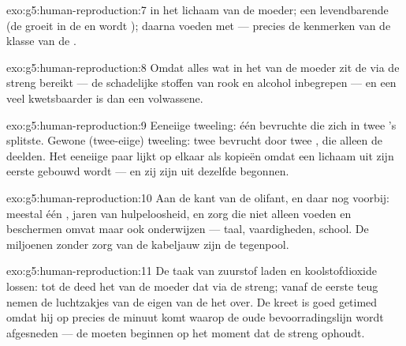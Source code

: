 \begin{solution}{exo:g5:human-reproduction:7}
 in het lichaam van de moeder; een levendbarende  (de
 groeit in de  en wordt ); daarna voeden met
 --- precies de kenmerken van de klasse van de .
\end{solution}

\begin{solution}{exo:g5:human-reproduction:8}
Omdat alles wat in het  van de moeder zit de  via de streng
bereikt --- de schadelijke stoffen van rook en alcohol inbegrepen --- en
een  veel kwetsbaarder is dan een volwassene.
\end{solution}

\begin{solution}{exo:g5:human-reproduction:9}
Eeneiige tweeling: één bevruchte  die zich in twee 's
splitste. Gewone (twee-eiige) tweeling: twee  bevrucht door twee
, die alleen de  deelden. Het eeneiige paar lijkt op
elkaar als kopieën omdat een lichaam uit zijn eerste  gebouwd wordt
--- en zij zijn uit dezelfde begonnen.
\end{solution}

\begin{solution}{exo:g5:human-reproduction:10}
Aan de kant van de olifant, en daar nog voorbij: meestal één , jaren
van hulpeloosheid, en zorg die niet alleen voeden en beschermen omvat
maar ook onderwijzen --- taal, vaardigheden, school. De miljoenen zonder
zorg van de kabeljauw zijn de tegenpool.
\end{solution}

\begin{solution}{exo:g5:human-reproduction:11}
De taak van zuurstof laden en koolstofdioxide lossen: tot de 
deed het  van de moeder dat via de streng; vanaf de eerste teug
nemen de luchtzakjes van de eigen  van de  het over. De kreet
is goed getimed omdat hij op precies de minuut komt waarop de oude
bevoorradingslijn wordt afgesneden --- de  moeten beginnen op het
moment dat de streng ophoudt.
\end{solution}

